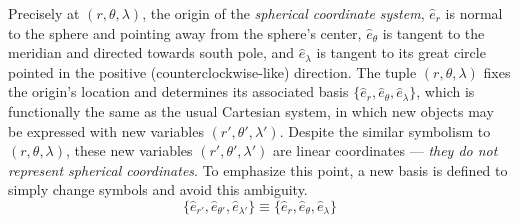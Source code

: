 \documentclass[11pt,dvipsnames]{thesis}
\begin{document}
Precisely at $(r, \theta, \lambda)$, the origin of the \textit{spherical coordinate system}, $\hat{e}_r$ is normal to the sphere and pointing away from the sphere's center, $\hat{e}_\theta$ is tangent to the meridian and directed towards south pole, and $\hat{e}_\lambda$ is tangent to its great circle pointed in the positive (counterclockwise-like) direction. The tuple $(r, \theta, \lambda)$ fixes the origin's location and determines its associated basis $\{\hat{e}_r, \hat{e}_\theta, \hat{e}_\lambda\}$, which is functionally the same as the usual Cartesian system, in which new objects may be expressed with new variables $(r', \theta', \lambda')$. Despite the similar symbolism to $(r, \theta, \lambda)$, these new variables $(r', \theta', \lambda')$ are linear coordinates --- \textit{they do not represent spherical coordinates}. To emphasize this point, a new basis is defined to simply change symbols and avoid this ambiguity.
\begin{equation}
\{\hat{e}_{r'}, \hat{e}_{\theta'}, \hat{e}_{\lambda'}\} \equiv \{\hat{e}_r, \hat{e}_\theta, \hat{e}_\lambda\}
\end{equation}
\end{document}
